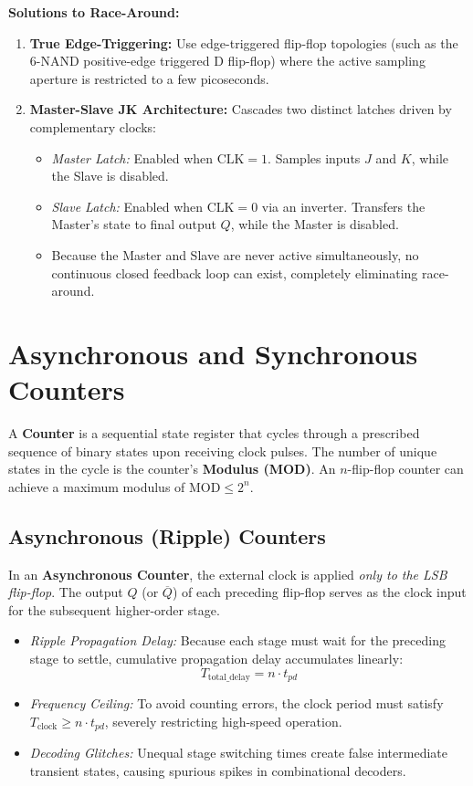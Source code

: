 \textbf{Solutions to Race-Around:}
\begin{enumerate}[label=\bfseries\arabic*.]
    \item \textbf{True Edge-Triggering:} Use edge-triggered flip-flop topologies (such as the 6-NAND positive-edge triggered D flip-flop) where the active sampling aperture is restricted to a few picoseconds.
    \item \textbf{Master-Slave JK Architecture:} Cascades two distinct latches driven by complementary clocks:
    \begin{itemize}
        \item \textit{Master Latch:} Enabled when $\text{CLK} = 1$. Samples inputs $J$ and $K$, while the Slave is disabled.
        \item \textit{Slave Latch:} Enabled when $\text{CLK} = 0$ via an inverter. Transfers the Master's state to final output $Q$, while the Master is disabled.
        \item Because the Master and Slave are never active simultaneously, no continuous closed feedback loop can exist, completely eliminating race-around.
    \end{itemize}
\end{enumerate}


\section{Asynchronous and Synchronous Counters}
\label{sec:counters}

A \textbf{Counter} is a sequential state register that cycles through a prescribed sequence of binary states upon receiving clock pulses. The number of unique states in the cycle is the counter's \textbf{Modulus (MOD)}. An $n$-flip-flop counter can achieve a maximum modulus of $\text{MOD} \le 2^n$.

\subsection{Asynchronous (Ripple) Counters}
In an \textbf{Asynchronous Counter}, the external clock is applied \textit{only to the LSB flip-flop}. The output $Q$ (or $\overline{Q}$) of each preceding flip-flop serves as the clock input for the subsequent higher-order stage.
\begin{itemize}
    \item \textit{Ripple Propagation Delay:} Because each stage must wait for the preceding stage to settle, cumulative propagation delay accumulates linearly:
    \begin{equation}
    \label{eq:ripple_delay}
    T_{\text{total\_delay}} = n \cdot t_{pd}
    \end{equation}
    \item \textit{Frequency Ceiling:} To avoid counting errors, the clock period must satisfy $T_{\text{clock}} \ge n \cdot t_{pd}$, severely restricting high-speed operation.
    \item \textit{Decoding Glitches:} Unequal stage switching times create false intermediate transient states, causing spurious spikes in combinational decoders.
\end{itemize}

